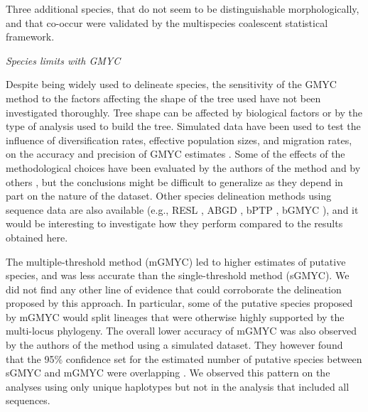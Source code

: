 \documentclass[12pt,letterpaper]{article}\usepackage[]{graphicx}\usepackage[]{color}
\renewcommand{\subsection}[1]{%
\bigskip
\begin{center}
\begin{large}
\normalfont\itshape #1
\end{large}
\end{center}}
\begin{document}
Three additional species, that do not seem to be distinguishable
morphologically, and that co-occur were validated by the multispecies coalescent
statistical framework.



\subsection{Species limits with GMYC}

Despite being widely used to delineate species, the sensitivity of the GMYC
method to the factors affecting the shape of the tree used have not been
investigated thoroughly. Tree shape can be affected by biological factors or by
the type of analysis used to build the tree. Simulated data have been used to
test the influence of diversification rates, effective population sizes, and
migration rates, on the accuracy and precision of GMYC estimates
\citep{Papadopoulou2008, Esselstyn2012}. Some of the effects of the
methodological choices have been evaluated by the authors of the method
\citep{Pons2006, Monaghan2009, Fujisawa2013} and by others \citep{Talavera2013},
but the conclusions might be difficult to generalize as they depend in part on
the nature of the dataset. Other species delineation methods using sequence data
are also available (e.g., RESL \citep{Ratnasingham2013}, ABGD
\citep{Puillandre2012a}, bPTP \citep{Zhang2013}, bGMYC \citep{Reid2012}), and it
would be interesting to investigate how they perform compared to the results
obtained here.

The multiple-threshold method (mGMYC) led to higher estimates of putative
species, and was less accurate than the single-threshold method (sGMYC). We did
not find any other line of evidence that could corroborate the delineation
proposed by this approach. In particular, some of the putative species proposed
by mGMYC would split lineages that were otherwise highly supported by the
multi-locus phylogeny. The overall lower accuracy of mGMYC was also observed by
the authors of the method using a simulated dataset. They however found that the
95\% confidence set for the estimated number of putative species between sGMYC
and mGMYC were overlapping \citep{Fujisawa2013}. We observed this pattern on the
analyses using only unique haplotypes but not in the analysis that included all
sequences.
\end{document}
